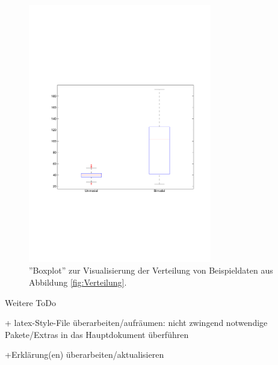 \begin{figure}
\begin{center}
	\includegraphics[trim = 25mm 75mm 15mm 90mm, clip, width=8cm]{matlab/statfig_50}
\caption{''Boxplot'' zur Visualisierung der Verteilung von Beispieldaten aus Abbildung \ref{fig:Verteilung}.\label{fig:Boxplot}}
\end{center}
\end{figure}

Weitere ToDo

+ latex-Style-File überarbeiten/aufräumen: nicht zwingend notwendige Pakete/Extras in das Hauptdokument überführen

+Erklärung(en) überarbeiten/aktualisieren  
